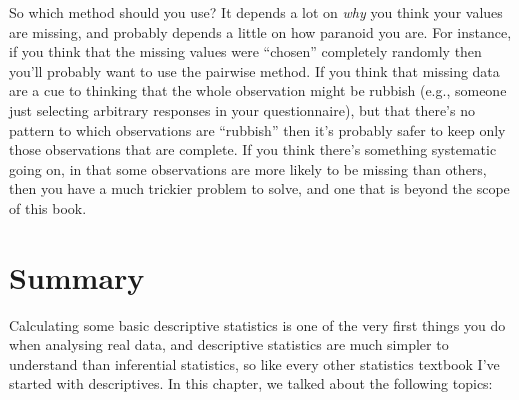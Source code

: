 So which method should you use? It depends a lot on {\it why} you think your values are missing, and probably depends a little on how paranoid you are. For instance, if you think that the missing values were ``chosen'' completely randomly then you'll probably want to use the pairwise method. If you think that missing data are a cue to thinking that the whole observation might be rubbish (e.g., someone just selecting arbitrary responses in your questionnaire), but that there's no pattern to which observations are ``rubbish'' then it's probably safer to keep only those observations that are complete. If you think there's something systematic going on, in that some observations are more likely to be missing than others, then you have a much trickier problem to solve, and one that is beyond the scope of this book.

\section{Summary}

Calculating some basic descriptive statistics is one of the very first things you do when analysing real data, and descriptive statistics are much simpler to understand than inferential statistics, so like every other statistics textbook I've started with descriptives. In this chapter, we talked about the following topics:

